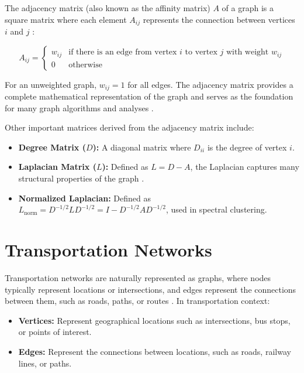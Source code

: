 The adjacency matrix (also known as the affinity matrix) $A$ of a graph is a square matrix where each element $A_{ij}$ represents the connection between vertices $i$ and $j$ \cite{godsil2001algebraic}:

\begin{equation}
    A_{ij} = 
    \begin{cases} 
        w_{ij} & \text{if there is an edge from vertex $i$ to vertex $j$ with weight $w_{ij}$} \\
        0 & \text{otherwise}
    \end{cases}
\end{equation}

For an unweighted graph, $w_{ij} = 1$ for all edges. The adjacency matrix provides a complete mathematical representation of the graph and serves as the foundation for many graph algorithms and analyses \cite{newman2010networks}.

Other important matrices derived from the adjacency matrix include:
\begin{itemize}
    \item \textbf{Degree Matrix ($D$):} A diagonal matrix where $D_{ii}$ is the degree of vertex $i$.
    \item \textbf{Laplacian Matrix ($L$):} Defined as $L = D - A$, the Laplacian captures many structural properties of the graph \cite{chung1997spectral}.
    \item \textbf{Normalized Laplacian:} Defined as $L_{\text{norm}} = D^{-1/2} L D^{-1/2} = I - D^{-1/2} A D^{-1/2}$, used in spectral clustering.
\end{itemize}

\section{Transportation Networks}
\label{se:TransportationNetworks}

Transportation networks are naturally represented as graphs, where nodes typically represent locations or intersections, and edges represent the connections between them, such as roads, paths, or routes \cite{rodrigue2020geography}. In transportation context:

\begin{itemize}
    \item \textbf{Vertices:} Represent geographical locations such as intersections, bus stops, or points of interest.
    \item \textbf{Edges:} Represent the connections between locations, such as roads, railway lines, or paths.
\end{itemize}


